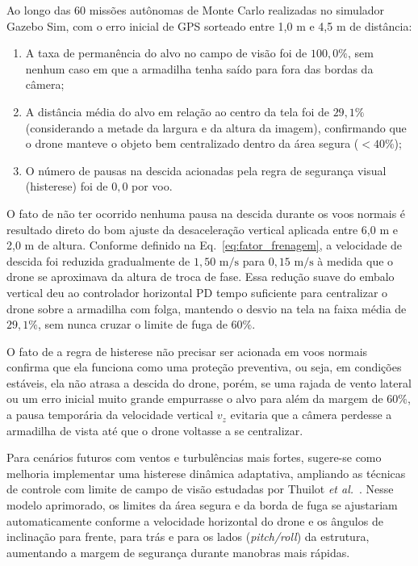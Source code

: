 Ao longo das 60 missões autônomas de Monte Carlo realizadas no simulador Gazebo Sim, com o erro inicial de GPS sorteado entre 1,0 m e 4,5 m de distância:
\begin{enumerate}
	\item A taxa de permanência do alvo no campo de visão foi de $100,0\%$, sem nenhum caso em que a armadilha tenha saído para fora das bordas da câmera;
	\item A distância média do alvo em relação ao centro da tela foi de $29,1\%$ (considerando a metade da largura e da altura da imagem), confirmando que o drone manteve o objeto bem centralizado dentro da área segura ($< 40\%$);
	\item O número de pausas na descida acionadas pela regra de segurança visual (histerese) foi de $0,0$ por voo.
\end{enumerate}


O fato de não ter ocorrido nenhuma pausa na descida durante os voos normais é resultado direto do bom ajuste da desaceleração vertical aplicada entre 6,0 m e 2,0 m de altura. Conforme definido na Eq.~\eqref{eq:fator_frenagem}, a velocidade de descida foi reduzida gradualmente de $1,50\text{ m/s}$ para $0,15\text{ m/s}$ à medida que o drone se aproximava da altura de troca de fase. Essa redução suave do embalo vertical deu ao controlador horizontal PD tempo suficiente para centralizar o drone sobre a armadilha com folga, mantendo o desvio na tela na faixa média de $29,1\%$, sem nunca cruzar o limite de fuga de $60\%$.

O fato de a regra de histerese não precisar ser acionada em voos normais confirma que ela funciona como uma proteção preventiva, ou seja, em condições estáveis, ela não atrasa a descida do drone, porém, se uma rajada de vento lateral ou um erro inicial muito grande empurrasse o alvo para além da margem de $60\%$, a pausa temporária da velocidade vertical $v_z$ evitaria que a câmera perdesse a armadilha de vista até que o drone voltasse a se centralizar.

Para cenários futuros com ventos e turbulências mais fortes, sugere-se como melhoria implementar uma histerese dinâmica adaptativa, ampliando as técnicas de controle com limite de campo de visão estudadas por Thuilot \textit{et al.}~\cite{thuilot2002}. Nesse modelo aprimorado, os limites da área segura e da borda de fuga se ajustariam automaticamente conforme a velocidade horizontal do drone e os ângulos de inclinação para frente, para trás e para os lados (\textit{pitch/roll}) da estrutura, aumentando a margem de segurança durante manobras mais rápidas.

